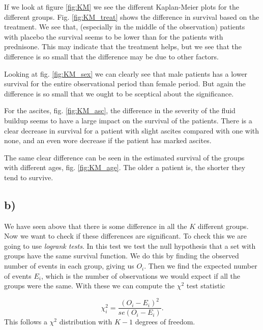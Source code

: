 \documentclass[a4paper,norsk, 10pt]{article}
\begin{document}
If we look at figure \ref{fig:KM} we see the different Kaplan-Meier plots for the different groups. Fig. \ref{fig:KM_treat} shows the difference in survival based on the treatment. We see that, (especially in the middle of the observation) patients with placebo the survival seems to be lower than for the patients with prednisone. This may indicate that the treatment helps, but we see that the difference is so small that the difference may be due to other factors.

Looking at fig. \ref{fig:KM_sex} we can clearly see that male patients has a lower survival for the entire observational period than female period. But again the difference is so small that we ought to be sceptical about the significance.

For the ascites, fig. \ref{fig:KM_asc}, the difference in the severity of the fluid buildup seems to have a large impact on the survival of the patients. There is a clear decrease in survival for a patient with slight ascites compared with one with none, and an even wore decrease if the patient has marked ascites.

The same clear difference can be seen in the estimated survival of the groups with different ages, fig. \ref{fig:KM_age}. The older a patient is, the shorter they tend to survive.


\subsection{b)}

We have seen above that there is some difference in all the $K$ different groups. Now we want to check if these differences are significant. To check this we are going to use \textit{logrank tests}. In this test we test the null hypothesis that a set with groups have the same survival function. We do this by finding the observed number of events in each group, giving us $O_i$. Then we find the expected number of events $E_i$, which is the number of observations we would expect if all the groups were the same. With these we can compute the $\chi^2$ test statistic

\begin{equation}
\chi^2_i = \frac{(O_i - E_i)^2}{se(O_i-E_i)}.
\end{equation}
This follows a $\chi^2$ distribution with $K-1$ degrees of freedom.
\end{document}
